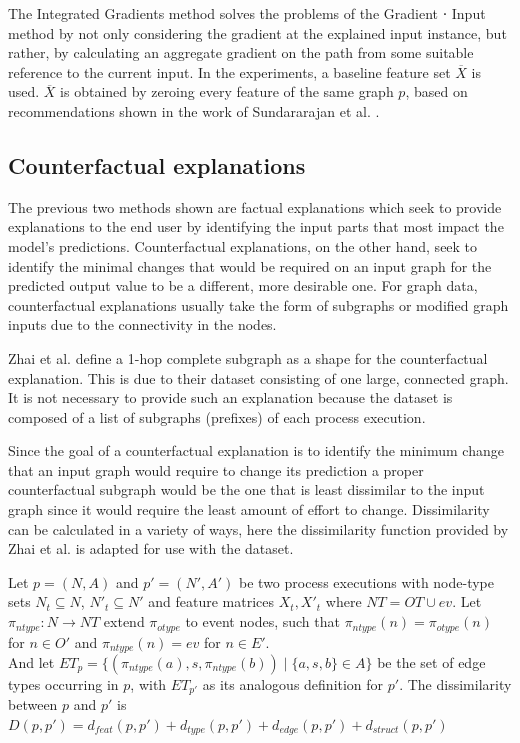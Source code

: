             The Integrated Gradients method solves the problems of the Gradient ⋅ Input method by not only considering the gradient at the explained input instance, but rather, by calculating an aggregate gradient on the path from some suitable reference to the current input. In the experiments, a baseline feature set $\overline{X}$ is used. $\overline{X}$ is obtained by zeroing every feature of the same graph $p$, based on recommendations shown in the work of Sundararajan et al. \cite{sundararajan2017}. 

        \subsection{Counterfactual explanations}
        \label{sec:dataset_cf}
            The previous two methods shown are factual explanations which seek to provide explanations to the end user by identifying the input parts that most impact the model's predictions. Counterfactual explanations, on the other hand, seek to identify the minimal changes that would be required on an input graph for the predicted output value to be a different, more desirable one. For graph data, counterfactual explanations usually take the form of subgraphs or modified graph inputs due to the connectivity in the nodes.

            Zhai et al. \cite{zhai2025} define a 1-hop complete subgraph as a shape for the counterfactual explanation. This is due to their dataset consisting of one large, connected graph. It is not necessary to provide such an explanation because the dataset is composed of a list of subgraphs (prefixes) of each process execution.

            Since the goal of a counterfactual explanation is to identify the minimum change that an input graph would require to change its prediction a proper counterfactual subgraph would be the one that is least dissimilar to the input graph since it would require the least amount of effort to change. Dissimilarity can be calculated in a variety of ways, here the dissimilarity function provided by Zhai et al. is adapted for use with the dataset.

            \begin{definition}
            \label{def:dissim}
                Let $p=(N,A)$ and $p'=(N',A')$ be two process executions with node-type sets $N_t\subseteq N$, $N'_{t}\subseteq N'$ and feature matrices $X_t, X'_t$ where $NT=OT\cup {ev}$.
                Let $\pi_{ntype}:N\to NT$ extend $\pi_{otype}$ to event nodes, such that $\pi_{ntype}(n) = \pi_{otype}(n)$ for $n\in O'$ and $\pi_{ntype}(n)=ev$ for $n\in E'$.\\
                And let $ET_p = \{(\pi_{ntype}(a),s,\pi_{ntype}(b)) \mid \{a,s,b\} \in A\}$ be the set of edge types occurring in $p$, with $ET_{p'}$ as its analogous definition for $p'$. 
                The dissimilarity between $p$ and $p'$ is
                $D(p,p')=d_{feat}(p,p') + d_{type}(p,p') + d_{edge}(p,p') + d_{struct}(p,p')$
            \end{definition}
            
